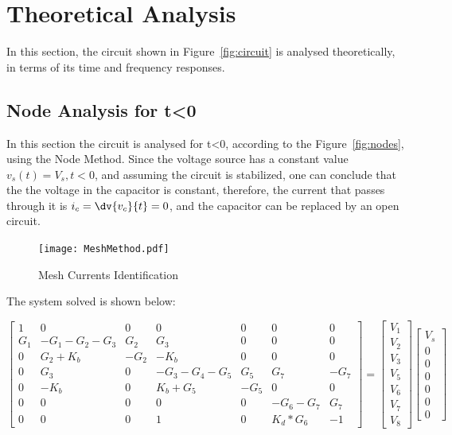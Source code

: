 \section{Theoretical Analysis}
\label{sec:analysis}

In this section, the circuit shown in Figure~\ref{fig:circuit} is analysed
theoretically, in terms of its time and frequency responses.

\subsection{Node Analysis for t<0}

In this section the circuit is analysed for t<0, according to the Figure~\ref{fig:nodes}, using the Node Method. Since the voltage source has a constant value $v_s(t)=V_s, t<0$, and assuming the circuit is stabilized, one can conclude that the the voltage in the capacitor is constant, therefore, the current that passes through it is $i_c=\dv{v_c}{t}=0$, and the capacitor can be replaced by an open circuit.\par

\begin{figure}[H] \centering
  \texttt{[image: MeshMethod.pdf]}
  \caption{Mesh Currents Identification}
  \label{fig:MeshMethod}
\end{figure}

The system solved is shown below:\par

$$
\begin{bmatrix}
  1 & 0 & 0 & 0 & 0 & 0 & 0 \\
  G_{1} & -G_{1}-G_{2}-G_{3} & G_{2} & G_{3} & 0 & 0 & 0 \\
  0 & G_{2}+K_{b} & -G_{2} & -K_{b} & 0 & 0 & 0 \\
  0 & G_{3} & 0 & -G_{3}-G_{4}-G_{5} & G_{5} & G_{7} & -G_{7} \\
  0 & -K_{b} & 0 & K_{b}+G_{5} & -G_{5} & 0 & 0 \\
  0 & 0 & 0 & 0 & 0 & -G_{6}-G_{7} & G_{7} \\
  0 & 0 & 0 & 1 & 0 & K_{d}*G_{6} & -1
\end{bmatrix}
=
\begin{bmatrix}
  V_{1}\\
  V_{2}\\
  V_{3}\\
  V_{5}\\
  V_{6}\\
  V_{7}\\
  V_{8}
\end{bmatrix}
\begin{bmatrix}
  V_{s}\\
  0\\
  0\\
  0\\
  0\\
  0\\
  0
\end{bmatrix}
$$

